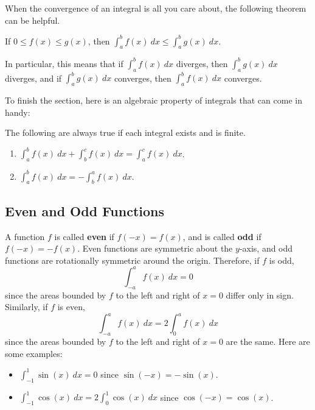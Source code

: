 When the convergence of an integral is all you care about, the following theorem can be helpful.

\begin{theorem}
If $0\leq f(x) \leq g(x)$, then $\int_a^b f(x)\ dx \leq \int_a^b g(x)\ dx$.
\end{theorem}

In particular, this means that if $\int_a^b f(x)\ dx$ diverges, then $\int_a^b g(x)\ dx$ diverges, and if $\int_a^b g(x)\ dx$ converges, then $\int_a^b f(x)\ dx$ converges.


To finish the section, here is an algebraic property of integrals that can come in handy:
\begin{theorem} The following are always true if each integral exists and is finite.
\begin{enumerate}
\item $\displaystyle\int_a^bf(x)\ dx + \int_b^cf(x)\ dx = \int_a^c f(x)\ dx$.
\item $\displaystyle\int_a^bf(x)\ dx = -\int_b^a f(x)\ dx$.
\end{enumerate}
\end{theorem}


\subsection{Even and Odd Functions}

A function $f$ is called \textbf{even} if $f(-x)=f(x)$, and is called \textbf{odd} if $f(-x)=-f(x)$. Even functions are symmetric about the $y$-axis, and odd functions are rotationally symmetric around the origin. Therefore, if $f$ is odd,
$$\int_{-a}^af(x)\ dx = 0$$
since the areas bounded by $f$ to the left and right of $x=0$ differ only in sign. Similarly, if $f$ is even,
$$\int_{-a}^af(x)\ dx = 2\int_{0}^af(x)\ dx$$
since the areas bounded by $f$ to the left and right of $x=0$ are the same.
Here are some examples:
\begin{itemize}
\item $\int_{-1}^1\sin(x)\ dx = 0$ since $\sin(-x)=-\sin(x)$.
\item $\int_{-1}^1\cos(x)\ dx = 2\int_0^1\cos(x)\ dx$ since $\cos(-x)=\cos(x)$.
\end{itemize}




